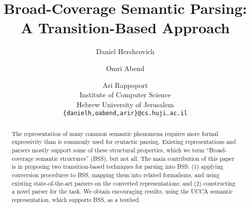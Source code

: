 \documentclass[11pt]{article}
\title{Broad-Coverage Semantic Parsing: A Transition-Based Approach}
\author{Daniel Hershcovich \and Omri Abend \and Ari Rappoport \\
  Institute of Computer Science \\
  Hebrew University of Jerusalem \\
  {\tt \{danielh,oabend,arir\}@cs.huji.ac.il}
}
\date{}
\begin{document}
\maketitle

\begin{abstract}

  The representation of many common semantic phenomena requires
  more formal expressivity than is commonly used for syntactic parsing.
  Existing representations and parsers mostly support some of these structural
  properties, which we term ``Broad-coverage semantic structures'' (BSS), but not all. 
  The main contribution of this paper is in proposing two transition-based
  techniques for parsing into BSS:
  (1) applying conversion procedures to BSS, mapping them into related
  formalisms, and using existing state-of-the-art parsers on the converted
  representations; and (2) constructing a novel parser for the task.
  We obtain encouraging results, using the UCCA semantic representation, which
  supports BSS, as a testbed.
  
  
  
\end{abstract}



\end{document}
